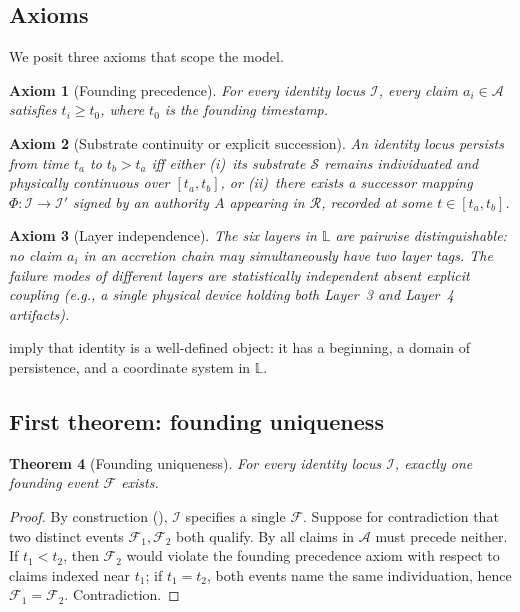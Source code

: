 \documentclass[11pt,a4paper,parskip=half-,DIV=12,headings=standardclasses]{scrartcl}
\theoremstyle{ncthm}
\newtheorem{theorem}{Theorem}[section]
\theoremstyle{ncdef}
\newtheorem{axiom}[theorem]{Axiom}
\newcommand{\identity}{\mathcal{I}}
\newcommand{\substrate}{\mathcal{S}}
\newcommand{\founding}{\mathcal{F}}
\newcommand{\accretion}{\mathcal{A}}
\newcommand{\relations}{\mathcal{R}}
\begin{document}
\subsection{Axioms}

We posit three axioms that scope the model.

\begin{axiom}[Founding precedence]\label{ax:founding-precedence}
For every identity locus $\identity$, every claim
$a_i \in \accretion$ satisfies $t_i \geq t_0$, where
$t_0$ is the founding timestamp.
\end{axiom}

\begin{axiom}[Substrate continuity or explicit succession]\label{ax:substrate-continuity}
An identity locus persists from time $t_a$ to $t_b > t_a$ iff either
(i)~its substrate $\substrate$ remains individuated and physically
continuous over $[t_a, t_b]$, or (ii)~there exists a successor
mapping $\Phi: \identity \to \identity'$ signed by an authority $A$
appearing in $\relations$, recorded at some
$t \in [t_a, t_b]$.
\end{axiom}

\begin{axiom}[Layer independence]\label{ax:layer-independence}
The six layers in $\mathbb{L}$ are pairwise distinguishable: no claim
$a_i$ in an accretion chain may simultaneously have two layer tags.
The failure modes of different layers are statistically independent
absent explicit coupling (e.g., a single physical device holding both
Layer~3 and Layer~4 artifacts).
\end{axiom}

imply that identity is a well-defined object: it has a beginning,
a domain of persistence, and a coordinate system in
$\mathbb{L}$.

\subsection{First theorem: founding uniqueness}

\begin{theorem}[Founding uniqueness]\label{thm:founding-uniqueness}
For every identity locus $\identity$, exactly one founding event
$\founding$ exists.
\end{theorem}

\begin{proof}
By construction (), $\identity$ specifies a
single $\founding$. Suppose for contradiction that two distinct events
$\founding_1, \founding_2$ both qualify. By
 all claims in $\accretion$ must precede
neither. If $t_1 < t_2$, then $\founding_2$ would violate the founding
precedence axiom with respect to claims indexed near $t_1$; if
$t_1 = t_2$, both events name the same individuation, hence
$\founding_1 = \founding_2$. Contradiction.
\end{proof}
\end{document}
